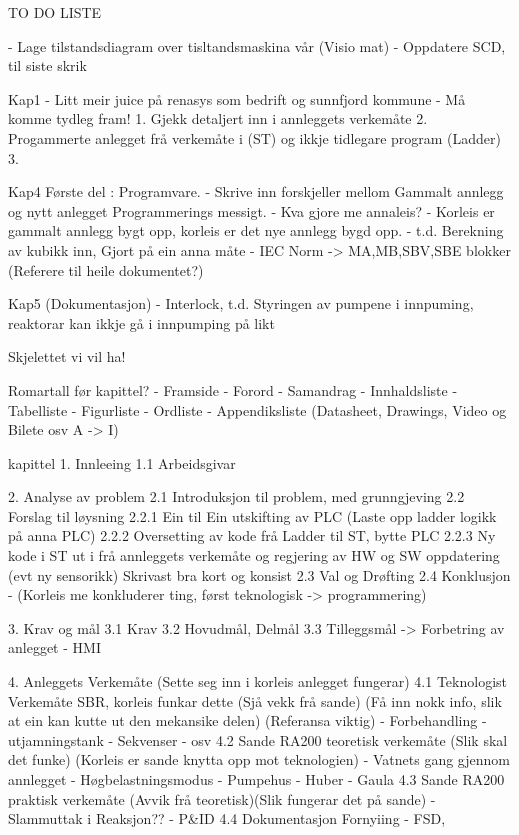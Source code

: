 TO DO LISTE




- Lage tilstandsdiagram over tisltandsmaskina vår (Visio mat)
- Oppdatere SCD, til siste skrik

Kap1
- Litt meir juice på renasys som bedrift og sunnfjord kommune
- Må komme tydleg fram! 
1. Gjekk detaljert inn i annleggets verkemåte
2. Progammerte anlegget frå verkemåte i (ST) og ikkje tidlegare program (Ladder)
3. 

Kap4
Første del : Programvare.
- Skrive inn forskjeller mellom Gammalt annlegg og nytt anlegget Programmerings messigt.
- Kva gjore me annaleis?
- Korleis er gammalt annlegg bygt opp, korleis er det nye annlegg bygd opp.
- t.d. Berekning av kubikk inn, Gjort på ein anna måte
- IEC Norm -> MA,MB,SBV,SBE blokker (Referere til heile dokumentet?)

Kap5 (Dokumentasjon)
- Interlock, t.d. Styringen av pumpene i innpuming, reaktorar kan ikkje gå i innpumping på likt



Skjelettet vi vil ha!

Romartall før kapittel?
- Framside
- Forord
- Samandrag
- Innhaldsliste
- Tabelliste
- Figurliste
- Ordliste
- Appendiksliste (Datasheet, Drawings, Video og Bilete osv A -> I)

kapittel
1. Innleeing
    1.1 Arbeidsgivar

2.  Analyse av problem
    2.1 Introduksjon til problem, med grunngjeving
    2.2 Forslag til løysning 
        2.2.1 Ein til Ein utskifting av PLC (Laste opp ladder logikk på anna PLC)
        2.2.2 Oversetting av kode frå Ladder til ST, bytte PLC
        2.2.3 Ny kode i ST ut i frå annleggets verkemåte og regjering av HW og SW oppdatering (evt ny sensorikk)
    Skrivast bra kort og konsist
    2.3 Val og Drøfting 
    2.4 Konklusjon - (Korleis me konkluderer ting, først teknologisk -> programmering)

3. Krav og mål
    3.1 Krav
    3.2 Hovudmål, Delmål
    3.3 Tilleggsmål -> Forbetring av anlegget
    - HMI

4. Anleggets Verkemåte (Sette seg inn i korleis anlegget fungerar)
    4.1 Teknologist Verkemåte SBR, korleis funkar dette (Sjå vekk frå sande) (Få inn nokk info, slik at ein kan kutte ut den mekansike delen) (Referansa viktig)
    - Forbehandling
    - utjamningstank
    - Sekvenser
    - osv
    4.2 Sande RA200 teoretisk verkemåte (Slik skal det funke) (Korleis er sande knytta opp mot teknologien)
    - Vatnets gang gjennom annlegget
    - Høgbelastningsmodus
    - Pumpehus
    - Huber
    - Gaula
    4.3 Sande RA200 praktisk verkemåte (Avvik frå teoretisk)(Slik fungerar det på sande)
    - Slammuttak i Reaksjon??
    - P&ID
    4.4 Dokumentasjon Fornyiing
    - FSD, 

